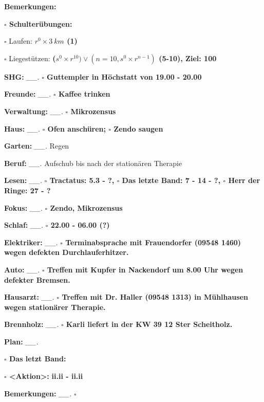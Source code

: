 \documentclass[10pt,a4paper]{article}
\newcommand\prop[1] {{\color {alizarin} {\bf #1}}}        %
\newcommand\opti[1] {{\color {amethyst} {\bf #1}}}        %
\newcommand\mand[1] {{\color {burntorange} {\bf #1}}}     %
\newcommand\topspace{\vskip -15pt \hskip 20pt}
\newcommand\bottomspace{\vskip 4pt}
\newcommand\n[1] { {\sl #1.} \hskip 5pt }
\begin{document}
\begin{mdframed}[style=daystyle]
\begin{labeling}{{\mand {Bemerkungen:}}}
\begin{minipage}{0.75\textwidth}
\begin{labeling}{\prop {$\square$ {Schulterübungen:}}}
      \item[$\square$ Laufen:]          {\prop {$r^0 \times 3\ km$ (1)}}
      \item[$\square$ Liegestützen:]    {\prop {($s^0 \times r^{10}) \vee (n=10, s^0 \times r^{n-1})$ (5-10), Ziel: 100}}
      \end{labeling}
    \end{minipage}
    \bottomspace    
  \item[{\mand {SHG:}}]          \n{\_\_} {\prop {$\square$ Guttempler in Höchstatt von 19.00 - 20.00}}
  \item[{\mand {Freunde:}}]      \n{\_\_} {\prop {$\square$ Kaffee trinken}}
  \item[{\mand {Verwaltung:}}]   \n{\_\_} {\prop {$\square$ Mikrozensus}}
  \item[{\mand {Haus:}}]         \n{\_\_} {\prop {$\square$ Ofen anschüren; $\square$ Zendo saugen}}
  \item[{\mand {Garten:}}]       \n{\_\_} Regen
  \item[{\mand {Beruf:}}]        \n{\_\_} Aufschub bis nach der stationären Therapie
  \item[{\mand {Lesen:}}]        \n{\_\_} {\prop {$\square$ Tractatus: 5.3 - ?,
      $\square$ Das letzte Band: 7 - 14 - ?, $\square$ Herr der Ringe: 27 - ?}}
  \item[{\mand {Fokus:}}]        \n{\_\_} {\prop {$\square$ Zendo, Mikrozensus}}
  \item[{\mand {Schlaf:}}]       \n{\_\_} {\prop {$\square$ 22.00 - 06.00 (?)}}
  \item[{\opti {Elektriker:}}]   \n{\_\_} {\prop {$\square$ Terminabsprache mit Frauendorfer (09548 1460) wegen
      defekten Durchlauferhitzer.}}
  \item[{\opti {Auto:}}]         \n{\_\_} {\prop {$\square$ Treffen mit Kupfer in Nackendorf um 8.00 Uhr
      wegen defekter Bremsen.}}
  \item[{\opti {Hausarzt:}}]     \n{\_\_} {\prop {$\square$ Treffen mit Dr. Haller (09548 1313) in Mühlhausen
      wegen stationärer Therapie.}}
  \item[{\opti {Brennholz:}}]    \n{\_\_} {\prop {$\square$ Karli liefert in der KW 39 12 Ster Scheitholz.}}
  \item[{\mand {Plan:}}]         \n{\_\_}
    \topspace
    \begin{minipage}{0.75\textwidth}  
      \begin{labeling}{\prop {$\square$ {Das letzt Band:}}} 
        \setlength\itemsep{-3pt}
      \item[{\prop {$\square$ <Aktion>:}}]  {\prop {ii.ii - ii.ii}}
      \end{labeling}
    \end{minipage}
    \bottomspace
  \item[{\mand {Bemerkungen:}}]  \n{\_\_} {\prop {$\square$}}
  \end{labeling}
    

\end{mdframed}
\end{document}
